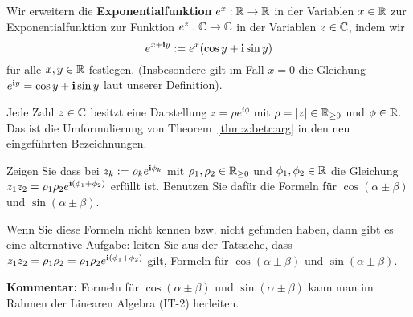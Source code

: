 \begin{defn}
	\label{def:euler:formel}
	Wir erweitern die \textbf{Exponentialfunktion} $e^x : \mathbb{R} \to \mathbb{R}$ in der Variablen $x \in \mathbb{R}$ zur Exponentialfunktion zur Funktion $e^z : \mathbb{C} \to \mathbb{C}$ in der Variablen $z \in \mathbb{C}$, indem wir 
	\[
			e^{x+ \mathbf{i} y} := e^x ( \cos y + \mathbf{i} \sin y)
	\]
	für alle $x, y \in \mathbb{R}$ festlegen. (Insbesondere gilt im Fall $x=0$ die Gleichung $e^{\mathbf{i} y} = \cos y + \mathbf{i} \sin y$ laut unserer Definition). 
\end{defn} 

\begin{bem}
	Jede Zahl $z \in \mathbb{C}$ besitzt eine Darstellung $z = \rho e^{i \phi}$ mit $\rho = |z| \in \mathbb{R}_{\ge 0}$ und $\phi \in \mathbb{R}$. Das ist die Umformulierung von Theorem~\ref{thm:z:betr:arg} in den neu eingeführten Bezeichnungen. 
\end{bem} 

\begin{aufg}
	Zeigen Sie dass bei $z_k := \rho_k e^{\mathbf{i} \phi_k}$ mit $\rho_1,\rho_2 \in \mathbb{R}_{\ge 0}$ und $\phi_1,\phi_2 \in \mathbb{R}$ die Gleichung $z_1 z_2 =  \rho_1 \rho_2 e^{\mathbf{i} (\phi_1 + \phi_2)}$ erfüllt ist.  Benutzen Sie dafür die Formeln für $\cos(\alpha \pm \beta)$ und $\sin(\alpha \pm \beta)$. 
	
	Wenn Sie diese Formeln nicht kennen bzw. nicht gefunden haben, dann gibt es eine alternative Aufgabe: leiten Sie aus der Tatsache, dass $z_1 z_2 = \rho_1 \rho_2 = \rho_1 \rho_2 e^{\mathbf{i}(\phi_1 + \phi_2)}$ gilt, Formeln für $\cos(\alpha \pm \beta)$ und $\sin(\alpha \pm \beta)$. 
	
	\textbf{Kommentar:} Formeln für $\cos(\alpha \pm \beta)$ und $\sin(\alpha \pm \beta)$ kann man im Rahmen der Linearen Algebra (IT-2) herleiten. 
\end{aufg} 


